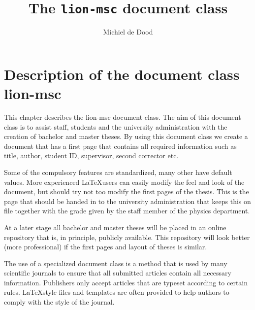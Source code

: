 \documentclass[twoside,single]{lion-msc}
\title{The \texttt{lion-msc} document class}
\author{Michiel de Dood}
\begin{document}

\maketitle

\tableofcontents
\cleardoublepage




\chapter{Description of the document class \textrm{lion-msc}}

This chapter describes the \textrm{lion-msc} document class. The aim of this document class is to assist staff, students and the university administration with the creation of bachelor and master theses. By using this document class we create a document that has a first page that contains all required information such as title, author, student ID, supervisor, second corrector etc.

Some of the compulsory features are standardized, many other have default values. More experienced \LaTeX users can easily modify the feel and look of the document, but should try not too modify the first pages of the thesis. This is the page that should be handed in to the university administration that keeps this on file together with the grade given by the staff member of the physics department.

At a later stage all bachelor and master theses will be placed in an online repository that is, in principle, publicly available. This repository will look better (more professional) if the first pages and layout of theses is similar.

The use of a specialized document class is a method that is used by many scientific journals to ensure that all submitted articles contain all necessary information. Publishers only accept articles that are typeset according to certain rules. \LaTeX style files and templates are often provided to help authors to comply with the style of the journal.
\end{document}
